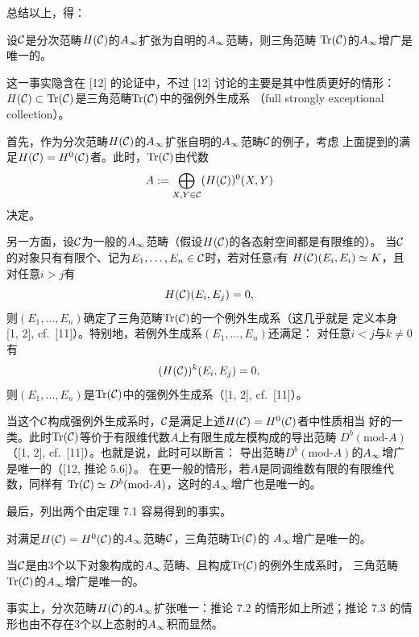 总结以上，得：

\begin{theorem}
  设$\mathcal{C}$是分次范畴$H(\mathcal{C})$的$A_{\infty}$扩张为自明的$A_{\infty}$范畴，则三角范畴
  $\operatorname{Tr}(\mathcal{C})$的$A_{\infty}$增广是唯一的。
  \label{thm:c06-7.1}
\end{theorem}

这一事实隐含在 [12] 的论证中，不过 [12] 讨论的主要是其中性质更好的情形：
$H(\mathcal{C})\subset\operatorname{Tr}(\mathcal{C})$是三角范畴$\operatorname{Tr}(\mathcal{C})$中的强例外生成系
（full strongly exceptional collection）。

首先，作为分次范畴$H(\mathcal{C})$的$A_{\infty}$扩张自明的$A_{\infty}$范畴$\mathcal{C}$的例子，考虑
上面提到的满足$H(\mathcal{C})=H^{0}(\mathcal{C})$者。此时，$\operatorname{Tr}(\mathcal{C})$由代数
\[
  A:=\bigoplus_{X,Y\in\mathcal{C}}(H(\mathcal{C}))^{0}(X,Y)
\]
决定。

另一方面，设$\mathcal{C}$为一般的$A_{\infty}$范畴（假设$H(\mathcal{C})$的各态射空间都是有限维的）。
当$\mathcal{C}$的对象只有有限个、记为$E_{1},\dots,E_{n}\in\mathcal{C}$时，若对任意$i$有
$H(\mathcal{C})(E_{i},E_{i})\simeq K$，且对任意$i>j$有
\[
  H(\mathcal{C})(E_{i},E_{j})=0,
\]
则$(E_{1},\dots,E_{n})$确定了三角范畴$\operatorname{Tr}(\mathcal{C})$的一个例外生成系（这几乎就是
定义本身 [1, 2], cf.\ [11]）。特别地，若例外生成系$(E_{1},\dots,E_{n})$还满足：
对任意$i<j$与$k\neq0$有
\[
  (H(\mathcal{C}))^{k}(E_{i},E_{j})=0,
\]
则$(E_{1},\dots,E_{n})$是$\operatorname{Tr}(\mathcal{C})$中的强例外生成系（[1, 2], cf.\ [11]）。


当这个$\mathcal{C}$构成强例外生成系时，$\mathcal{C}$是满足上述$H(\mathcal{C})=H^{0}(\mathcal{C})$者中性质相当
好的一类。此时$\operatorname{Tr}(\mathcal{C})$等价于有限维代数$A$上有限生成左模构成的导出范畴
$D^{b}(\mathrm{mod}\text{-}A)$（[1, 2], cf.\ [11]）。也就是说，此时可以断言：
导出范畴$D^{b}(\mathrm{mod}\text{-}A)$的$A_{\infty}$增广是唯一的（[12, 推论 5.6]）。
在更一般的情形，若$A$是同调维数有限的有限维代数，同样有
$\operatorname{Tr}(\mathcal{C})\simeq D^{b}(\mathrm{mod}\text{-}A)$，这时的$A_{\infty}$增广也是唯一的。

最后，列出两个由定理 7.1 容易得到的事实。

\begin{corollary}
  对满足$H(\mathcal{C})=H^{0}(\mathcal{C})$的$A_{\infty}$范畴$\mathcal{C}$，三角范畴$\operatorname{Tr}(\mathcal{C})$的
  $A_{\infty}$增广是唯一的。
  \label{cor:c06-7.2}
\end{corollary}

\begin{corollary}
  当$\mathcal{C}$是由$3$个以下对象构成的$A_{\infty}$范畴、且构成$\operatorname{Tr}(\mathcal{C})$的例外生成系时，
  三角范畴$\operatorname{Tr}(\mathcal{C})$的$A_{\infty}$增广是唯一的。
  \label{cor:c06-7.3}
\end{corollary}

事实上，分次范畴$H(\mathcal{C})$的$A_{\infty}$扩张唯一：推论 7.2 的情形如上所述；推论 7.3
的情形也由不存在$3$个以上态射的$A_{\infty}$积而显然。
